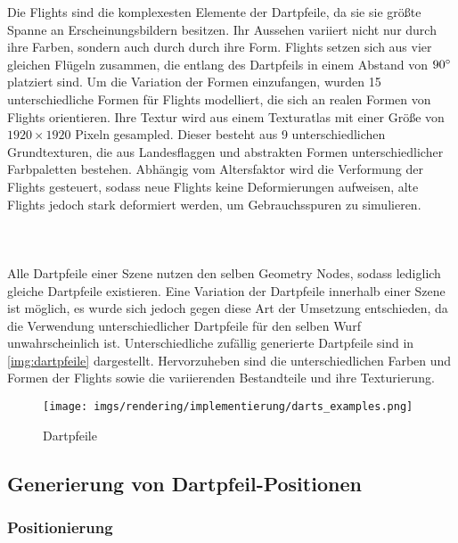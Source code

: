 Die Flights sind die komplexesten Elemente der Dartpfeile, da sie sie größte Spanne an Erscheinungsbildern besitzen. Ihr Aussehen variiert nicht nur durch ihre Farben, sondern auch durch durch ihre Form. Flights setzen sich aus vier gleichen Flügeln zusammen, die entlang des Dartpfeils in einem Abstand von $90^{\circ}$ platziert sind. Um die Variation der Formen einzufangen, wurden 15 unterschiedliche Formen für Flights modelliert, die sich an realen Formen von Flights orientieren. Ihre Textur wird aus einem Texturatlas mit einer Größe von $1920 \times 1920$ Pixeln gesampled. Dieser besteht aus 9 unterschiedlichen Grundtexturen, die aus Landesflaggen und abstrakten Formen unterschiedlicher Farbpaletten bestehen. Abhängig vom Altersfaktor wird die Verformung der Flights gesteuert, sodass neue Flights keine Deformierungen aufweisen, alte Flights jedoch stark deformiert werden, um Gebrauchsspuren zu simulieren.

\paragraph{\,\,}

Alle Dartpfeile einer Szene nutzen den selben Geometry Nodes, sodass lediglich gleiche Dartpfeile existieren. Eine Variation der Dartpfeile innerhalb einer Szene ist möglich, es wurde sich jedoch gegen diese Art der Umsetzung entschieden, da die Verwendung unterschiedlicher Dartpfeile für den selben Wurf unwahrscheinlich ist. Unterschiedliche zufällig generierte Dartpfeile sind in \autoref{img:dartpfeile} dargestellt. Hervorzuheben sind die unterschiedlichen Farben und Formen der Flights sowie die variierenden Bestandteile und ihre Texturierung.

\begin{figure}
    \centering
    \texttt{[image: imgs/rendering/implementierung/darts\_examples.png]}
    \caption{Dartpfeile}
    \label{img:dartpfeile}
\end{figure}

\subsection{Generierung von Dartpfeil-Positionen}  %
\label{sec:wie_dartpfeil_positionen}

\subsubsection{Positionierung}


